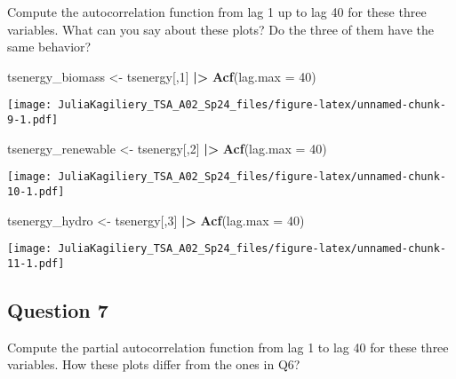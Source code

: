 \documentclass[
]{article}
\newenvironment{Shaded}{\begin{snugshade}}{\end{snugshade}}
\newcommand{\AttributeTok}[1]{\textcolor[rgb]{0.13,0.29,0.53}{#1}}
\newcommand{\DecValTok}[1]{\textcolor[rgb]{0.00,0.00,0.81}{#1}}
\newcommand{\FunctionTok}[1]{\textcolor[rgb]{0.13,0.29,0.53}{\textbf{#1}}}
\newcommand{\NormalTok}[1]{#1}
\newcommand{\OtherTok}[1]{\textcolor[rgb]{0.56,0.35,0.01}{#1}}
\newcommand{\SpecialCharTok}[1]{\textcolor[rgb]{0.81,0.36,0.00}{\textbf{#1}}}
\begin{document}
Compute the autocorrelation function from lag 1 up to lag 40 for these
three variables. What can you say about these plots? Do the three of
them have the same behavior?

\begin{Shaded}
\begin{Highlighting}[]
\NormalTok{tsenergy\_biomass }\OtherTok{\textless{}{-}}\NormalTok{ tsenergy[,}\DecValTok{1}\NormalTok{] }\SpecialCharTok{|\textgreater{}}
  \FunctionTok{Acf}\NormalTok{(}\AttributeTok{lag.max =} \DecValTok{40}\NormalTok{)}
\end{Highlighting}
\end{Shaded}

\texttt{[image: JuliaKagiliery\_TSA\_A02\_Sp24\_files/figure-latex/unnamed-chunk-9-1.pdf]}

\begin{Shaded}
\begin{Highlighting}[]
\NormalTok{tsenergy\_renewable }\OtherTok{\textless{}{-}}\NormalTok{ tsenergy[,}\DecValTok{2}\NormalTok{] }\SpecialCharTok{|\textgreater{}}
  \FunctionTok{Acf}\NormalTok{(}\AttributeTok{lag.max =} \DecValTok{40}\NormalTok{)}
\end{Highlighting}
\end{Shaded}

\texttt{[image: JuliaKagiliery\_TSA\_A02\_Sp24\_files/figure-latex/unnamed-chunk-10-1.pdf]}

\begin{Shaded}
\begin{Highlighting}[]
\NormalTok{tsenergy\_hydro }\OtherTok{\textless{}{-}}\NormalTok{ tsenergy[,}\DecValTok{3}\NormalTok{] }\SpecialCharTok{|\textgreater{}}
  \FunctionTok{Acf}\NormalTok{(}\AttributeTok{lag.max =} \DecValTok{40}\NormalTok{)}
\end{Highlighting}
\end{Shaded}

\texttt{[image: JuliaKagiliery\_TSA\_A02\_Sp24\_files/figure-latex/unnamed-chunk-11-1.pdf]}

\hypertarget{question-7}{%
\subsection{Question 7}\label{question-7}}

Compute the partial autocorrelation function from lag 1 to lag 40 for
these three variables. How these plots differ from the ones in Q6?
\end{document}
